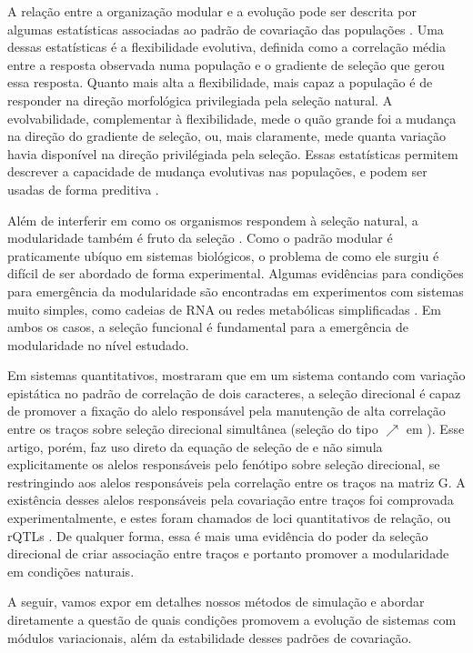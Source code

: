A relação entre a organização modular e a evolução pode ser descrita por
algumas estatísticas associadas ao padrão de covariação das populações
\citep{Hansen2008}. 
Uma dessas estatísticas é a flexibilidade evolutiva, definida como a
correlação média entre a resposta observada numa população e o gradiente
de seleção que gerou essa resposta. 
Quanto mais alta a flexibilidade, mais capaz a população é de responder
na direção morfológica privilegiada pela seleção natural. 
A evolvabilidade, complementar à flexibilidade, mede o quão grande foi a
mudança na direção do gradiente de seleção, ou, mais claramente, mede
quanta variação havia disponível na direção privilégiada pela seleção. 
Essas estatísticas permitem descrever a capacidade de mudança evolutivas
nas populações, e podem ser usadas de forma preditiva
\citep{Marroig2010}. 


Além de interferir em como os organismos respondem à seleção natural, a
modularidade também é fruto da seleção \citep{Wagner1996, Wagner2007}. 
Como o padrão modular é praticamente ubíquo em sistemas biológicos, o
problema de como ele surgiu é difícil de ser abordado de forma
experimental. 
Algumas evidências para condições para emergência da modularidade são
encontradas em experimentos com sistemas muito simples, como cadeias de
RNA \citep{Ancel2000} ou redes metabólicas simplificadas
\citep{Espinosa-Soto2010}. 
Em ambos os casos, a seleção funcional é fundamental para a emergência
de modularidade no nível estudado.

Em sistemas quantitativos, \cite{Pavlicev2010} mostraram que em um
sistema contando com variação epistática no padrão de correlação de dois
caracteres, a seleção direcional é capaz de promover a fixação do alelo
responsável pela manutenção de alta correlação entre os traços sobre
seleção direcional simultânea  (seleção do tipo $\nearrow$ em
\cite{Jones2004}). 
Esse artigo, porém, faz uso direto da equação de seleção de
\cite{Lande1979} e não simula explicitamente os alelos responsáveis pelo
fenótipo sobre seleção direcional, se restringindo aos alelos
responsáveis pela correlação entre os traços na matriz G. 
A existência desses alelos responsáveis pela covariação entre traços foi
comprovada experimentalmente, e estes foram chamados de loci
quantitativos de relação, ou rQTLs \citep{Pavlicev2008a}. 
De qualquer forma, essa é mais uma evidência do poder da seleção
direcional de criar associação entre traços e portanto promover a
modularidade em condições naturais.

A seguir, vamos expor em detalhes nossos métodos de simulação e abordar
diretamente a questão de quais condições promovem a evolução de sistemas
com módulos variacionais, além da estabilidade desses padrões de
covariação.
